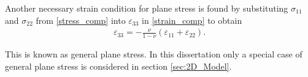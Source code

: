 \documentclass[../../main.tex]{subfiles}
\begin{document}
Another necessary strain condition for plane stress is found by substituting
$\sigma_{11}$ and $\sigma_{22}$ from \eqref{stress_comp} into
$\varepsilon_{33}$ in \eqref{strain_comp} to obtain
\begin{eqnarray}
	\varepsilon_{33} = -\frac{\nu}{1-\nu} (\varepsilon_{11} + \varepsilon_{22}).\label{plane_stress_neseccary_condition}
\end{eqnarray}

This is known as general plane stress. In this dissertation only a special case
of general plane stress is considered in section \ref{sec:2D_Model}.
\end{document}
